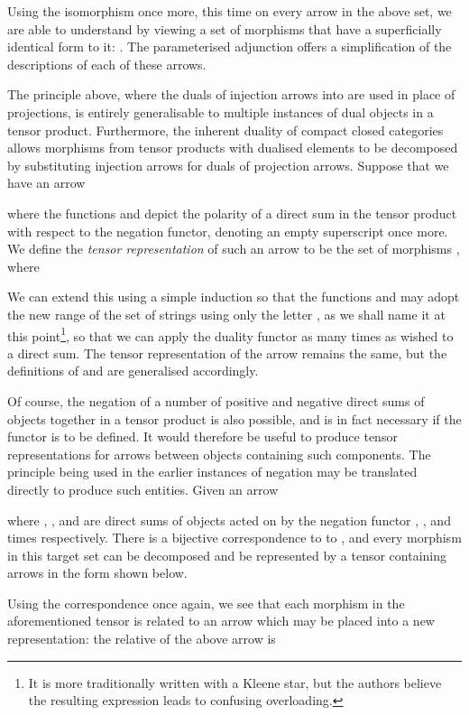 \documentclass{LMCS}
\theoremstyle{plain}\newtheorem*{cLm}{Claim}
\newcommand{\p}{} \newcommand{\N}{\mathbb{N}}
\newcommand{\hughf}[1]{#1}
\newcommand{\hughg}[1]{#1}
\begin{document}
\p Using the isomorphism once more, this time on every arrow in the above set, we are able to understand  by viewing a set of morphisms that have a superficially identical form to it: . The parameterised adjunction offers a simplification of the descriptions of each of these arrows.


The principle above, where the duals of injection arrows into  are used in place of projections, is entirely generalisable to multiple instances of dual objects in a tensor product. Furthermore, the inherent duality of compact closed categories allows morphisms from tensor products with dualised elements to be decomposed by substituting injection arrows for duals of projection arrows. Suppose that we have an arrow

where the functions \hughf{ and  depict the polarity of a direct sum in the tensor product with respect to the negation functor,  denoting an empty superscript once more.} We define the \emph{tensor representation} of such an arrow to be the set of morphisms \hughf{}, where


We can extend this using a simple induction so that the functions  and  \hughg{may adopt the new range of the set of strings using only the letter ,  as we shall name it at this point\footnote{\hughf{It is more traditionally written with a Kleene star, but the authors believe the resulting expression  leads to confusing overloading.}}, so that we can apply the duality functor as many times as wished to a direct sum.} The tensor representation of the arrow  remains the same, but the definitions of  and  are generalised accordingly.


Of course, the negation of a number of positive and negative direct sums of objects together in a tensor product is also possible, and is in fact necessary if the  functor is to be defined. It would therefore be useful to produce tensor representations for arrows between objects containing such components. The principle being used in the earlier instances of negation may be translated directly to produce such entities. Given an arrow

where , ,  and  are direct sums of objects acted on by the negation functor , ,  and  times respectively. There is a bijective correspondence  to  to , and every morphism in this target set can be decomposed and be represented by a tensor containing arrows in the form shown below.

Using the correspondence  once again, we see that each morphism in the aforementioned tensor is related to an arrow which may be placed into a new representation: the relative of the above arrow is
\end{document}
